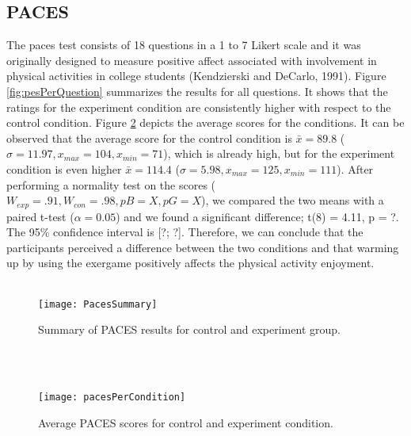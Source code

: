 \subsection{PACES}
The \acrshort{paces} test consists of 18 questions in a 1 to 7 Likert scale and it was originally designed to measure positive affect associated with involvement in physical activities in college students (Kendzierski and DeCarlo, 1991). Figure \ref{fig:pesPerQuestion} summarizes the results for all questions. It shows that the ratings for the experiment condition are consistently higher with respect to the control condition. Figure \ref{fig:pacesPerCondition} depicts the average scores for the conditions. It can be observed that the average score for the control condition is \begin{math}\bar{x} = 89.8 \end{math} (\begin{math} \sigma = 11.97, x_{max}= 104, x_{min}= 71\end{math}), which is already high, but for the experiment condition is even higher  \begin{math}\bar{x} = 114.4 \end{math} (\begin{math} \sigma = 5.98, x_{max}= 125, x_{min}= 111\end{math}). After performing a normality test on the scores (\begin{math}W_{exp} = .91, W_{con} = .98, pB = X, pG = X\end{math}), we compared the two means with a paired t-test (\begin{math}\alpha = 0.05\end{math}) and we found a significant difference; t(8) = 4.11, p = ?. The 95\% confidence interval is [?; ?]. Therefore, we can conclude that the participants 
perceived a difference between the two conditions and that warming up by using the exergame positively affects the physical activity enjoyment.\\\\
\begin{figure}[h]
    \centering
    \texttt{[image: PacesSummary]}
    \caption{Summary of PACES results for control and experiment group.}
    \label{fig:pacees}
\end{figure}\\\\
\begin{figure}[h]
    \centering
    \texttt{[image: pacesPerCondition]}
    \caption{Average PACES scores for control and experiment condition.}
    \label{fig:pacesPerCondition}
\end{figure}\pagebreak
